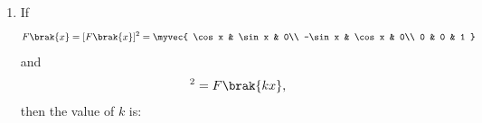 \begin{enumerate}[label=\thesubsection.\arabic*, ref=\thesubsection.\theenumi]
\solution
The symmetric equation of a line is
\begin{align}
\frac{x-x_1}{a}=
\frac{y-y_1}{b}=
\frac{z-z_1}{c},
\end{align}
where $a,b,c$ are the direction ratios of the line.
\\The given equation is
\begin{align}
\frac{2x-1}{2}=-y=\frac{6z+1}{3}.
\end{align}
Rewrite each expression in standard form:
\begin{align}
\frac{x-\frac12}{1}
=
\frac{y-0}{-\frac12}
=
\frac{z+\frac16}{\frac12}.
\end{align}
Therefore, direction ratios are
\begin{align}
1,-\frac12,\frac12.
\end{align}
Multiplying each by $2$ gives the proportional direction ratios
\begin{align}
2,-1,1.
\end{align}

\item
If
\begin{align}
F\brak{x}=
[F\brak{x}]^2=
\myvec{
\cos x & \sin x & 0\\
-\sin x & \cos x & 0\\
0 & 0 & 1
}
\end{align}
and
\begin{align}
[F\brak{x}]^2=F\brak{kx},
\end{align}
then the value of $k$ is:

\begin{enumerate}
\end{enumerate}

\solution


\end{enumerate}
